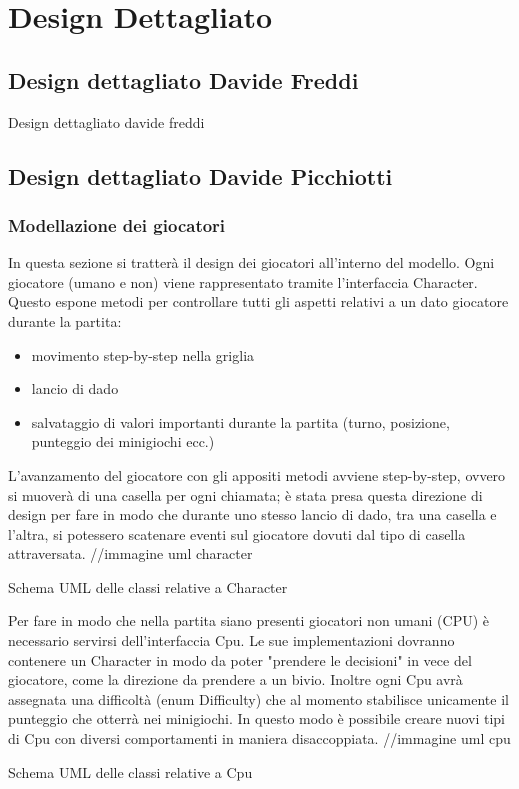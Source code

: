 \documentclass[a4paper,12pt]{report}
\begin{document}
	\section{Design Dettagliato}
	\subsection{Design dettagliato Davide Freddi}
	Design dettagliato davide freddi
	\subsection{Design dettagliato Davide Picchiotti}
	\subsubsection{Modellazione dei giocatori}
	In questa sezione si tratterà il design dei giocatori all'interno del modello.\newline
	\newline
	Ogni giocatore (umano e non) viene rappresentato tramite l'interfaccia Character.
	Questo espone metodi per controllare tutti gli aspetti relativi a un dato giocatore durante la partita:\begin{itemize}
																											   \item movimento step-by-step nella griglia
																											   \item lancio di dado
																											   \item salvataggio di valori importanti durante la partita (turno, posizione, punteggio dei minigiochi ecc.)
	\end{itemize}
	L'avanzamento del giocatore con gli appositi metodi avviene step-by-step, ovvero si muoverà di una
	casella per ogni chiamata; è stata presa questa direzione di design per fare in modo che durante
	uno stesso lancio di dado, tra una casella e l'altra, si potessero scatenare eventi sul giocatore
	dovuti dal tipo di casella attraversata.\newline
	//immagine uml character\newline
	\caption{Schema UML delle classi relative a Character}
	Per fare in modo che nella partita siano presenti giocatori non umani (CPU) è necessario servirsi
	dell'interfaccia Cpu.\newline
	Le sue implementazioni dovranno contenere un Character in modo da poter "prendere le decisioni" in vece del giocatore, come la direzione da prendere a un bivio.\newline
	Inoltre ogni Cpu avrà assegnata una difficoltà (enum Difficulty) che al momento stabilisce unicamente il punteggio che otterrà nei minigiochi.\newline
	In questo modo è possibile creare nuovi tipi di Cpu con diversi comportamenti in maniera disaccoppiata.
	//immagine uml cpu\newline
	\caption{Schema UML delle classi relative a Cpu}
\end{document}
